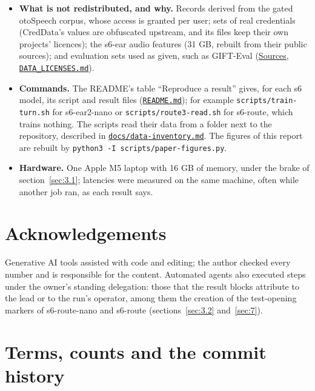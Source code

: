 \documentclass[10pt]{article}
\begin{document}
\begin{itemize}
\item \textbf{What is not redistributed, and why.} Records derived from the gated otoSpeech corpus, whose access is granted per user; sets of real credentials (CredData's values are obfuscated upstream, and its files keep their own projects' licences); the s6-ear audio features (31 GB, rebuilt from their public sources); and evaluation sets used as given, such as GIFT-Eval (\href{https://maxgfr.github.io/skycmd/sources/\#our-datasets-on-hugging-face}{Sources}, \href{https://github.com/maxgfr/skycmd/blob/main/DATA_LICENSES.md}{\texttt{DATA\_\allowbreak{}LICENSES.md}}).
\item \textbf{Commands.} The README's table ``Reproduce a result'' gives, for each s6 model, its script and result files (\href{https://github.com/maxgfr/skycmd/blob/main/README.md\#reproduce-a-result}{\texttt{README.md}}); for example \texttt{scripts/\allowbreak{}train-turn.sh} for s6-ear2-nano or \texttt{scripts/\allowbreak{}route3-read.sh} for s6-route, which trains nothing. The scripts read their data from a folder next to the repository, described in \href{https://github.com/maxgfr/skycmd/blob/main/docs/data-inventory.md}{\texttt{docs/\allowbreak{}data-inventory.md}}. The figures of this report are rebuilt by \texttt{python3 -I scripts/\allowbreak{}paper-figures.py}.
\item \textbf{Hardware.} One Apple M5 laptop with 16 GB of memory, under the brake of section~\ref{sec:3.1}; latencies were measured on the same machine, often while another job ran, as each result says.
\end{itemize}

\section*{Acknowledgements}

Generative AI tools assisted with code and editing; the author checked every number and is responsible for the content. Automated agents also executed steps under the owner's standing delegation: those that the result blocks attribute to the lead or to the run's operator, among them the creation of the test-opening markers of s6-route-nano and s6-route (sections~\ref{sec:3.2} and~\ref{sec:7}).

{\footnotesize\raggedright\setlength{\bibsep}{1.5pt plus 0.5pt}


}

\appendix
\renewcommand{\thetable}{\Alph{section}\arabic{table}}\setcounter{table}{0}
\section{Terms, counts and the commit history}\label{sec:A}
\end{document}
